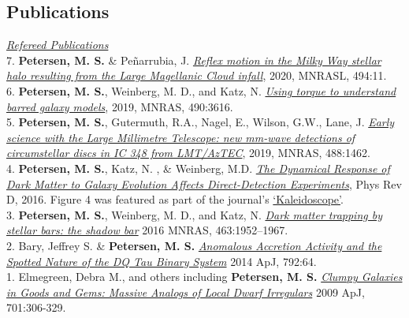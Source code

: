 \documentclass[margin, a4paper,11pt]{res} %
\begin{document}
\begin{resume}
\section{\sc \textcolor{redshade}{Publications} }
 \underline{\sl Refereed Publications} \\
7. {\bf \textcolor{blueshade}{Petersen, M. S.}} \& Pe{\~n}arrubia, J. \href{https://ui.adsabs.harvard.edu/abs/2020MNRAS.494L..11P/abstract}{\it Reflex motion in the Milky Way stellar halo resulting from the Large Magellanic Cloud infall}, 2020, MNRASL, 494:11. \\
6. {\bf \textcolor{blueshade}{Petersen, M. S.}}, Weinberg, M. D., and Katz, N. \href{https://ui.adsabs.harvard.edu/abs/2019MNRAS.490.3616P/abstract}{\it Using torque to understand barred galaxy models}, 2019, MNRAS, 490:3616. \\
5. {\bf \textcolor{blueshade}{Petersen, M. S.}}, Gutermuth, R.A.,  Nagel, E.,  Wilson, G.W., Lane, J. \href{https://ui.adsabs.harvard.edu/abs/2019MNRAS.488.1462P/abstract}{\it Early science with the Large Millimetre Telescope: new mm-wave detections of circumstellar discs in IC 348 from LMT/AzTEC}, 2019, MNRAS, 488:1462.\\
4. {\bf \textcolor{blueshade}{Petersen, M. S.}}, Katz, N. , \& Weinberg, M.D. \href{http://adsabs.harvard.edu/abs/2016PhRvD..94l3013P}{{\it The Dynamical Response of Dark Matter to Galaxy Evolution Affects Direct-Detection Experiments}}, Phys Rev D, 2016. Figure 4 was featured as part of the journal's \href{https://journals.aps.org/prd/kaleidoscope/prd/94/12/123013}{`Kaleidoscope'}.\\
3. {\bf \textcolor{blueshade}{Petersen, M. S.}}, Weinberg, M. D., and Katz, N. \href{http://adsabs.harvard.edu/abs/2016MNRAS.463.1952P}{\it
  Dark matter trapping by stellar bars: the shadow bar} 2016 MNRAS,
463:1952–1967. \\
2. Bary, Jeffrey S. \& {\bf \textcolor{blueshade}{Petersen, M. S.}}
\href{http://adsabs.harvard.edu/abs/2014ApJ...792...64B}{\it Anomalous
  Accretion Activity and the Spotted Nature of the DQ Tau Binary
  System} 2014 ApJ, 792:64. \\
1. Elmegreen, Debra M., and others including {\bf \textcolor{blueshade}{Petersen, M. S.}} \href{https://ui.adsabs.harvard.edu/abs/2009ApJ...701..306E/abstract}{\it Clumpy Galaxies in Goods and Gems: Massive Analogs of Local Dwarf Irregulars} 2009 ApJ, 701:306-329.\\



\end{resume}
\end{document}
